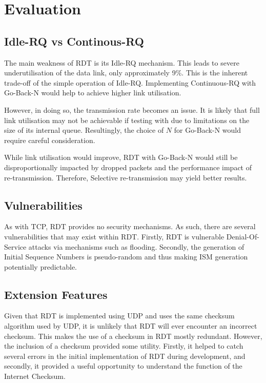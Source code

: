 \section{Evaluation}
\subsection{Idle-RQ vs Continous-RQ}
The main weakness of RDT is its Idle-RQ mechanism. This leads to severe underutilisation of the data link, only approximately 9\%. This is the inherent trade-off of the simple operation of Idle-RQ. Implementing Continuous-RQ with Go-Back-N would help to achieve higher link utilisation. 

However, in doing so, the transmission rate becomes an issue. It is likely that full link utilisation may not be achievable if testing with  due to limitations on the size of its internal queue. Resultingly, the choice of $N$ for Go-Back-N would require careful consideration. 

While link utilisation would improve, RDT with Go-Back-N would still be disproportionally impacted by dropped packets and the performance impact of re-transmission. Therefore, Selective re-transmission may yield better results.

\subsection{Vulnerabilities}
As with TCP, RDT provides no security mechanisms. As such, there are several vulnerabilities that may exist within RDT. 
Firstly, RDT is vulnerable Denial-Of-Service attacks via mechanisms such as  flooding.
Secondly, the generation of Initial Sequence Numbers is pseudo-random and thus making ISM generation potentially predictable. 

\subsection{Extension Features}

Given that RDT is implemented using UDP and uses the same checksum algorithm used by UDP, it is unlikely that RDT will ever encounter an incorrect checksum. This makes the use of a checksum in RDT mostly redundant. However, the inclusion of a checksum provided some utility. Firstly, it helped to catch several errors in the initial implementation of RDT during development, and secondly, it provided a useful opportunity to understand the function of the Internet Checksum.

